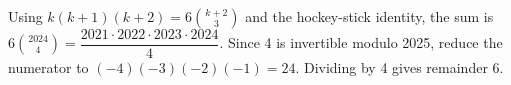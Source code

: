 Using $k(k+1)(k+2)=6\binom{k+2}{3}$ and the hockey-stick identity, the sum is $6\binom{2024}{4}=\dfrac{2021\cdot2022\cdot2023\cdot2024}{4}$. Since 4 is invertible modulo 2025, reduce the numerator to $(-4)(-3)(-2)(-1)=24$. Dividing by 4 gives remainder $\boxed6$.
